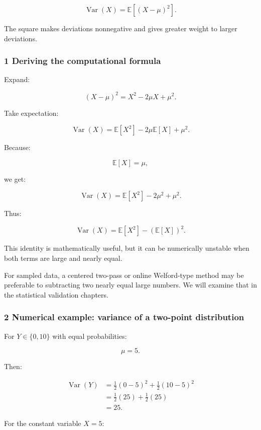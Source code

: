 \[
 \boxed{ \operatorname{Var}(X)= \mathbb E[(X-\mu)^2] }.
\]

The square makes deviations nonnegative and gives greater weight to larger deviations.

\subsubsection{1 Deriving the computational formula}\label{02-foundations-ii-ch023-deriving-the-computational-formula}

Expand:

\[
 (X-\mu)^2=X^2-2\mu X+\mu^2.
\]

Take expectation:

\[
 \operatorname{Var}(X) = \mathbb E[X^2] -2\mu\mathbb E[X] +\mu^2.
\]

Because:

\[
 \mathbb E[X]=\mu,
\]

we get:

\[
 \operatorname{Var}(X) = \mathbb E[X^2]-2\mu^2+\mu^2.
\]

Thus:

\[
 \boxed{ \operatorname{Var}(X)= \mathbb E[X^2]-(\mathbb E[X])^2 }.
\]

This identity is mathematically useful, but it can be numerically unstable when both terms are large and nearly equal.

For sampled data, a centered two-pass or online Welford-type method may be preferable to subtracting two nearly equal large numbers. We will examine that in the statistical validation chapters.

\subsubsection{2 Numerical example: variance of a two-point distribution}\label{02-foundations-ii-ch023-numerical-example-variance-of-a-two-point-distribution}

For \(Y\in\{0,10\}\) with equal probabilities:

\[
 \mu=5.
\]

Then:

\[
 \begin{aligned} \operatorname{Var}(Y) &=\frac12(0-5)^2+\frac12(10-5)^2\\ &=\frac12(25)+\frac12(25)\\ &=\boxed{25}. \end{aligned}
\]

For the constant variable \(X=5\):

